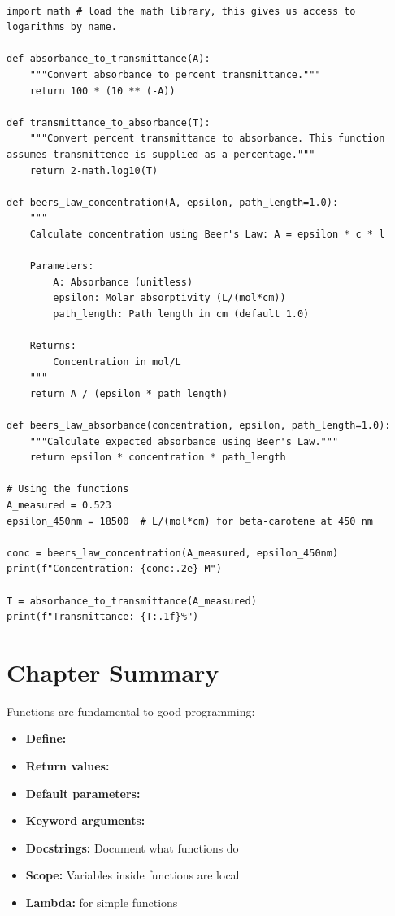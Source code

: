\begin{lstlisting}

import math # load the math library, this gives us access to logarithms by name.

def absorbance_to_transmittance(A):
    """Convert absorbance to percent transmittance."""
    return 100 * (10 ** (-A))

def transmittance_to_absorbance(T):
    """Convert percent transmittance to absorbance. This function assumes transmittence is supplied as a percentage."""
    return 2-math.log10(T)

def beers_law_concentration(A, epsilon, path_length=1.0):
    """
    Calculate concentration using Beer's Law: A = epsilon * c * l

    Parameters:
        A: Absorbance (unitless)
        epsilon: Molar absorptivity (L/(mol*cm))
        path_length: Path length in cm (default 1.0)

    Returns:
        Concentration in mol/L
    """
    return A / (epsilon * path_length)

def beers_law_absorbance(concentration, epsilon, path_length=1.0):
    """Calculate expected absorbance using Beer's Law."""
    return epsilon * concentration * path_length

# Using the functions
A_measured = 0.523
epsilon_450nm = 18500  # L/(mol*cm) for beta-carotene at 450 nm

conc = beers_law_concentration(A_measured, epsilon_450nm)
print(f"Concentration: {conc:.2e} M")

T = absorbance_to_transmittance(A_measured)
print(f"Transmittance: {T:.1f}%")
\end{lstlisting}

\section{Chapter Summary}
\label{sec:functions-summary}

Functions are fundamental to good programming:

\begin{itemize}
    \item \textbf{Define:} 
    \item \textbf{Return values:} 
    \item \textbf{Default parameters:} 
    \item \textbf{Keyword arguments:} 
    \item \textbf{Docstrings:} Document what functions do
    \item \textbf{Scope:} Variables inside functions are local
    \item \textbf{Lambda:}  for simple functions
\end{itemize}

